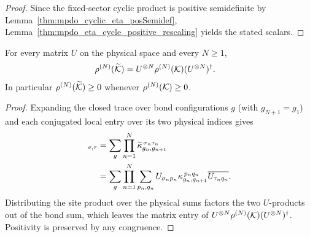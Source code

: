 \begin{proof}
    \leanok
    Since the fixed-sector cyclic product is positive semidefinite by
    Lemma~\ref{thm:mpdo_cyclic_eta_posSemidef},
    Lemma~\ref{thm:mpdo_eta_cycle_positive_rescaling} yields the stated
    scalars.
\end{proof}

\begin{lemma}%
    \label{thm:mpdo_conjugated_chain_congruence}
    \leanok
    For every matrix $U$ on the physical space and every $N\ge1$,
    \begin{align}
        \rho^{(N)}(\widetilde{\cal K})
         & =U^{\otimes N} \rho^{(N)}({\cal K})
        (U^{\otimes N})^\dagger.
        \notag
    \end{align}
    In particular $\rho^{(N)}(\widetilde{\cal K})\ge0$ whenever
    $\rho^{(N)}({\cal K})\ge0$.
\end{lemma}

\begin{proof}
    \leanok
    Expanding the closed trace over bond configurations $g$ (with
    $g_{N+1}=g_1$) and each conjugated local entry over its two physical
    indices gives
    \begin{align}
        [\rho^{(N)}(\widetilde{\cal K})]_{\sigma,\tau}
         & =\sum_{g}\prod_{n=1}^{N}
        \widetilde\kappa_{g_n,g_{n+1}}^{\,\sigma_n\tau_n}
        \notag                                    \\
         & =\sum_{g}\prod_{n=1}^{N}\sum_{p_n,q_n}
        U_{\sigma_n p_n}
        \kappa_{g_n,g_{n+1}}^{\,p_n q_n}
        \overline{U_{\tau_n q_n}}.
        \notag
    \end{align}
    Distributing the site product over the physical sums factors the two
    $U$-products out of the bond sum, which leaves the matrix entry of
    $U^{\otimes N}\rho^{(N)}({\cal K})(U^{\otimes N})^\dagger$.
    Positivity is preserved by any congruence.
\end{proof}

